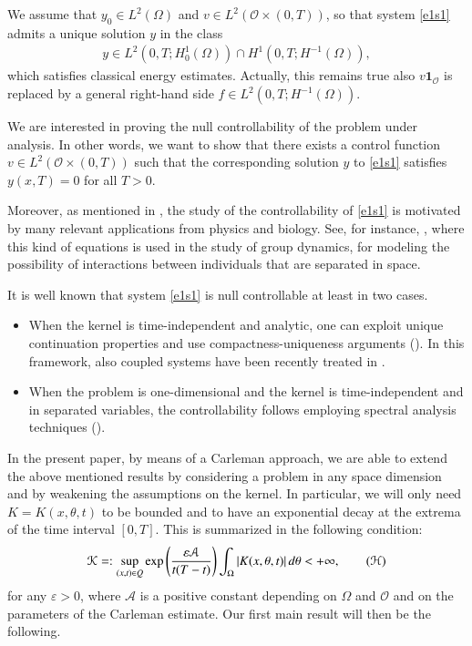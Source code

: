 \documentclass[preprint,1p]{elsarticle}
\begin{document}
We assume that $y_0\in L^2(\Omega)$ and $v\in L^2(\mathcal O\times(0,T))$, so that system \eqref{e1s1} admits a unique solution $y$ in the class
\begin{align*}
	y\in L^2(0,T;H^{1}_{0}(\Omega))\cap H^1(0,T;H^{-1}(\Omega)),
\end{align*}
which satisfies classical energy estimates. Actually, this remains true also $v\mathbf{1}_{\mathcal O}$ is replaced by a general right-hand side $f\in L^2(0,T;H^{-1}(\Omega))$.

We are interested in proving the null controllability of the problem under analysis. In other words, we want to show that there exists a control function $v\in L^2(\mathcal O\times(0,T))$ such that the corresponding solution $y$ to \eqref{e1s1} satisfies $y(x,T)=0$ for all $T>0$.

Moreover, as mentioned in \cite{fernandez2016null}, the study of the controllability of \eqref{e1s1} is motivated by many relevant applications from physics and biology. See, for instance, \cite[Section 7.9.2]{okubo2013diffusion}, where this kind of equations is used in the study of group dynamics, for modeling the possibility of interactions between individuals that are separated in space. 

It is well known that system \eqref{e1s1} is null controllable at least in two cases.
\begin{itemize}
	\item When the kernel is time-independent and analytic, one can exploit unique continuation properties and use compactness-uniqueness arguments (\cite{fernandez2016null}). In this framework, also coupled systems have been recently treated in \cite{lissy2017internal}.
	\item When the problem is one-dimensional and the kernel is time-independent and in separated variables, the controllability follows employing spectral analysis techniques (\cite{micu2017local}).
\end{itemize}

In the present paper, by means of a Carleman approach, we are able to extend the above mentioned results by considering a problem in any space dimension and by weakening the assumptions on the kernel. In particular, we will only need ${K=K(x,\theta,t)}$ to be bounded and to have an exponential decay at the extrema of the time interval $[0,T]$. This is summarized in the following condition:
%
\begin{align}\label{K_est_gen}
	\mathcal{K}=:\sup_{(x,t)\in Q} \exp\left(\frac{\varepsilon\mathcal{A}}{t(T-t)}\right)\int_{\Omega} |K(x,\theta,t)|\,d\theta < +\infty, \tag{$\mathcal{H}$}
\end{align}
for any $\varepsilon>0$, where $\mathcal{A}$ is a positive constant depending on $\Omega$ and $\mathcal{O}$ and on the parameters of the Carleman estimate. Our first main result will then be the following.
\end{document}
